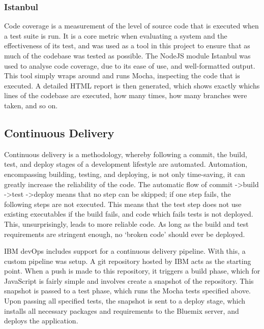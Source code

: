 \documentclass{article}
\begin{document}
\subsubsection{Istanbul}
Code coverage is a measurement of the level of source code that is executed when a test suite is run. It is a core metric when evaluating a system and the effectiveness of its test, and was used as a tool in this project to ensure that as much of the codebase was tested as possible. The NodeJS module Istanbul was used to analyse code coverage, due to its ease of use, and well-formatted output\cite{istanbul}. This tool simply wraps around and runs Mocha, inspecting the code that is executed. A detailed HTML report is then generated, which shows exactly whichs lines of the codebase are executed, how many times, how many branches were taken, and so on. 


\subsection{Continuous Delivery} \label{ContinuousDelivery}
Continuous delivery is a methodology, whereby following a commit, the build, test, and deploy stages of a development lifestyle are automated. Automation, encompassing building, testing, and deploying, is not only time-saving, it can greatly increase the reliability of the code. The automatic flow of commit -\textgreater build -\textgreater test -\textgreater deploy means that no step can be skipped; if one step fails, the following steps are not executed. This means that the test step does not use existing executables if the build fails, and code which fails tests is not deployed. This, unsurprisingly, leads to more reliable code. As long as the build and test requirements are stringent enough, no ‘broken code’ should ever be deployed\cite{co475}.

IBM devOps includes support for a continuous delivery pipeline. With this, a custom pipeline was setup. A git repository hosted by IBM acts as the starting point. When a push is made to this repository, it triggers a build phase, which for JavaScript is fairly simple and involves create a snapshot of the repository. This snapshot is passed to a test phase, which runs the Mocha tests specified above. Upon passing all specified tests, the snapshot is sent to a deploy stage, which installs all necessary packages and requirements to the Bluemix server, and deploys the application. 
\end{document}

